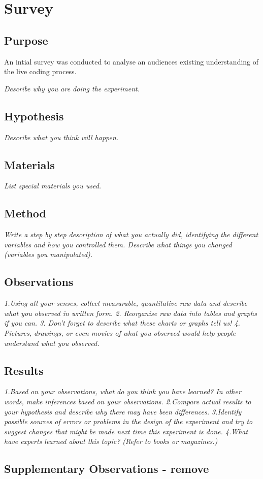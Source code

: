 
\chapter{Survey}
\label{cha:survey}

\section{Purpose}

An intial survey was conducted to analyse an audiences existing understanding of the live coding process. 

\textit{Describe why you are doing the experiment.}

\section{Hypothesis}
\textit{Describe what you think will happen.}
\section{Materials}
\textit{List special materials you used.}
\section{Method}
\textit{Write a step by step description of what you actually did, identifying the different variables and how you controlled them. Describe what things you changed (variables you manipulated).}
\section{Observations}
\textit{1.Using all your senses, collect measurable, quantitative raw data and describe what you observed in written form.
2. Reorganise raw data into tables and graphs if you can.
3. Don't forget to describe what these charts or graphs tell us!
4. Pictures, drawings, or even movies of what you observed would help people understand what you observed.}
\section{Results}
\textit{1.Based on your observations, what do you think you have learned? In other words, make inferences based on your observations.
2.Compare actual results to your hypothesis and describe why there may have been differences.
3.Identify possible sources of errors or problems in the design of the experiment and try to suggest changes that might be made next time this experiment is done.
4.What have experts learned about this topic? (Refer to books or magazines.)}

\section{Supplementary Observations - remove}


